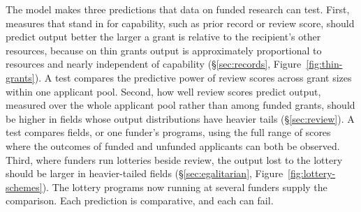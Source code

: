 \documentclass[article, 11pt, reqno]{amsart}
\theoremstyle{named}
\begin{document}
The model makes three predictions that data on funded research can test. First, measures that stand in for capability, such as prior record or review score, should predict output better the larger a grant is relative to the recipient's other resources, because on thin grants output is approximately proportional to resources and nearly independent of capability (\S\ref{sec:records}, Figure~\ref{fig:thin-grants}). A test compares the predictive power of review scores across grant sizes within one applicant pool. Second, how well review scores predict output, measured over the whole applicant pool rather than among funded grants, should be higher in fields whose output distributions have heavier tails (\S\ref{sec:review}). A test compares fields, or one funder's programs, using the full range of scores where the outcomes of funded and unfunded applicants can both be observed. Third, where funders run lotteries beside review, the output lost to the lottery should be larger in heavier-tailed fields (\S\ref{sec:egalitarian}, Figure~\ref{fig:lottery-schemes}). The lottery programs now running at several funders supply the comparison. Each prediction is comparative, and each can fail.

\begin{appendices}



\end{appendices}



\end{document}
